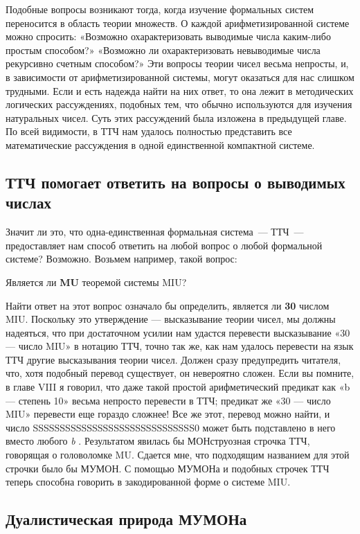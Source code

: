 \documentclass[../main.tex]{subfiles}
\begin{document}
Подобные вопросы возникают тогда, когда изучение формальных систем переносится в область теории множеств. О каждой арифметизированной системе можно спросить: «Возможно охарактеризовать выводимые числа каким-либо простым способом?» «Возможно ли охарактеризовать невыводимые числа рекурсивно счетным способом?» Эти вопросы теории чисел весьма непросты, и, в зависимости от арифметизированной системы, могут оказаться для нас слишком трудными. Если и есть надежда найти на них ответ, то она лежит в методических логических рассуждениях, подобных тем, что обычно используются для изучения натуральных чисел. Суть этих рассуждений была изложена в предыдущей главе. По всей видимости, в ТТЧ нам удалось полностью представить все математические рассуждения в одной единственной компактной системе.


\subsection{ТТЧ помогает ответить на вопросы о выводимых числах}

Значит ли это, что одна-единственная формальная система~--- ТТЧ~--- предоставляет нам способ ответить на любой вопрос о любой формальной системе? Возможно. Возьмем например, такой вопрос:

Является ли \textbf{MU} теоремой системы MIU?

Найти ответ на этот вопрос означало бы определить, является ли \textbf{30} числом MIU. Поскольку это утверждение --- высказывание теории чисел, мы должны надеяться, что при достаточном усилии нам удастся перевести высказывание «30 --- число MIU» в нотацию ТТЧ, точно так же, как нам удалось перевести на язык ТТЧ другие высказывания теории чисел. Должен сразу предупредить читателя, что, хотя подобный перевод существует, он невероятно сложен. Если вы помните, в главе VIII я говорил, что даже такой простой арифметический предикат как «b --- степень 10» весьма непросто перевести в ТТЧ; предикат же «30 --- число MIU» перевести еще гораздо сложнее! Все же этот, перевод можно найти, и число SSSSSSSSSSSSSSSSSSSSSSSSSSSSSS0 может быть подставлено в него вместо любого \emph{b} . Результатом явилась бы МОНструозная строчка ТТЧ, говорящая о головоломке MU. Сдается мне, что подходящим названием для этой строчки было бы МУМОН. С помощью МУМОНа и подобных строчек ТТЧ теперь способна говорить в закодированной форме о системе MIU.


\subsection{Дуалистическая природа МУМОНа}
\end{document}
